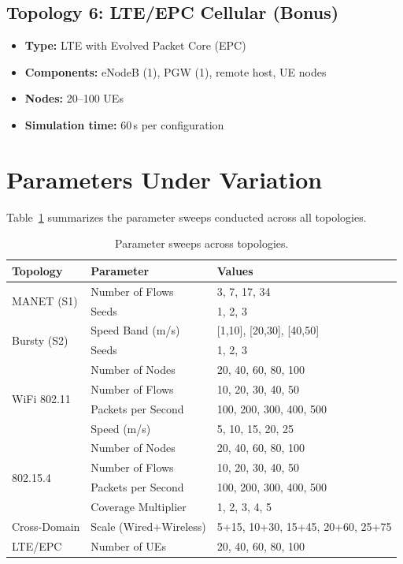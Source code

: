 \documentclass[12pt,a4paper]{article}
\begin{document}
\subsection{Topology 6: LTE/EPC Cellular (Bonus)}
\label{sec:topo_lte}
\begin{itemize}[nosep]
    \item \textbf{Type:} LTE with Evolved Packet Core (EPC)
    \item \textbf{Components:} eNodeB (1), PGW (1), remote host, UE nodes
    \item \textbf{Nodes:} 20--100 UEs
    \item \textbf{Simulation time:} 60\,s per configuration
\end{itemize}

\section{Parameters Under Variation}
\label{sec:parameters}

Table~\ref{tab:param_sweeps} summarizes the parameter sweeps conducted across all topologies.

\begin{table}[H]
\centering
\caption{Parameter sweeps across topologies.}
\label{tab:param_sweeps}
\small
\begin{tabularx}{\textwidth}{l l X}
\toprule
\textbf{Topology} & \textbf{Parameter} & \textbf{Values} \\
\midrule
\multirow{2}{*}{MANET (S1)} & Number of Flows & 3, 7, 17, 34 \\
& Seeds & 1, 2, 3 \\
\midrule
\multirow{2}{*}{Bursty (S2)} & Speed Band (m/s) & {[}1,10{]}, {[}20,30{]}, {[}40,50{]} \\
& Seeds & 1, 2, 3 \\
\midrule
\multirow{4}{*}{WiFi 802.11} & Number of Nodes & 20, 40, 60, 80, 100 \\
& Number of Flows & 10, 20, 30, 40, 50 \\
& Packets per Second & 100, 200, 300, 400, 500 \\
& Speed (m/s) & 5, 10, 15, 20, 25 \\
\midrule
\multirow{4}{*}{802.15.4} & Number of Nodes & 20, 40, 60, 80, 100 \\
& Number of Flows & 10, 20, 30, 40, 50 \\
& Packets per Second & 100, 200, 300, 400, 500 \\
& Coverage Multiplier & 1, 2, 3, 4, 5 \\
\midrule
Cross-Domain & Scale (Wired+Wireless) & 5+15, 10+30, 15+45, 20+60, 25+75 \\
\midrule
LTE/EPC & Number of UEs & 20, 40, 60, 80, 100 \\
\bottomrule
\end{tabularx}
\end{table}
\end{document}
